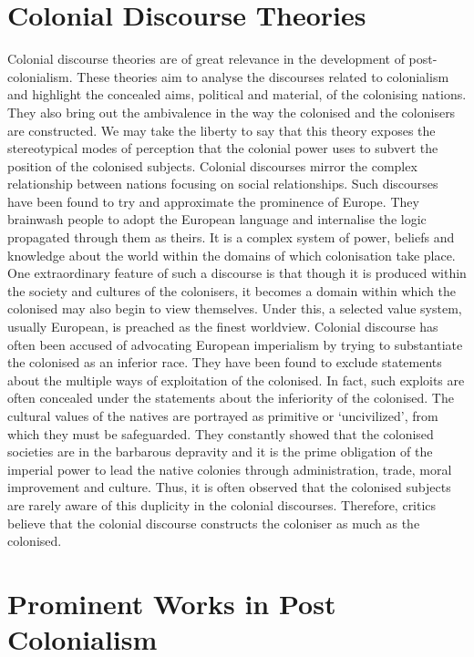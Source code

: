 \section{Colonial Discourse Theories}

Colonial discourse theories are of great relevance in the development of post-colonialism. These theories aim to analyse the discourses related to colonialism and highlight the concealed aims, political and material, of the colonising nations. They also bring out the ambivalence in the way the colonised and the colonisers are constructed. We may take the liberty to say that this theory exposes the stereotypical modes of perception that the colonial power uses to subvert the position of the colonised subjects. Colonial discourses mirror the complex relationship between nations focusing on social relationships. Such discourses have been found to try and approximate the prominence of Europe. They brainwash people to adopt the European language and internalise the logic propagated through them as theirs. It is a complex system of power, beliefs and knowledge about the world within the domains of which colonisation take place. One extraordinary feature of such a discourse is that though it is produced within the society and cultures of the colonisers, it becomes a domain within which the colonised may also begin to view themselves. Under this, a selected value system, usually European, is preached as the finest worldview. Colonial discourse has often been accused of advocating European imperialism by trying to substantiate the colonised as an inferior race. They have been found to exclude statements about the multiple ways of exploitation of the colonised. In fact, such exploits are often concealed under the statements about the inferiority of the colonised. The cultural values of the natives are portrayed as primitive or ‘uncivilized’, from which they must be safeguarded. They constantly showed that the colonised societies are in the barbarous depravity and it is the prime obligation of the imperial power to lead the native colonies through administration, trade, moral improvement and culture. Thus, it is often observed that the colonised subjects are rarely aware of this duplicity in the colonial discourses. Therefore, critics believe that the colonial discourse constructs the coloniser as much as the colonised.

\section{Prominent Works in Post Colonialism}

